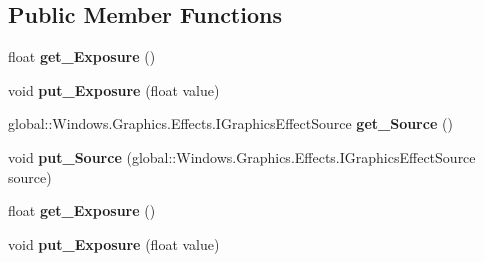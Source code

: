 \subsection*{Public Member Functions}
\begin{DoxyCompactItemize}
\item 
\mbox{\label{interface_microsoft_1_1_graphics_1_1_canvas_1_1_effects_1_1_i_exposure_effect_a1188ad6764c93c08d490ac661c4032b4}} 
float {\bfseries get\+\_\+\+Exposure} ()
\item 
\mbox{\label{interface_microsoft_1_1_graphics_1_1_canvas_1_1_effects_1_1_i_exposure_effect_a2c5a92f7fb62eb7eb49b18388e03bc0c}} 
void {\bfseries put\+\_\+\+Exposure} (float value)
\item 
\mbox{\label{interface_microsoft_1_1_graphics_1_1_canvas_1_1_effects_1_1_i_exposure_effect_a79e10b828da17b64688522fdf34da98b}} 
global\+::\+Windows.\+Graphics.\+Effects.\+I\+Graphics\+Effect\+Source {\bfseries get\+\_\+\+Source} ()
\item 
\mbox{\label{interface_microsoft_1_1_graphics_1_1_canvas_1_1_effects_1_1_i_exposure_effect_acb4229c8aabe612f5f1c7898033e5826}} 
void {\bfseries put\+\_\+\+Source} (global\+::\+Windows.\+Graphics.\+Effects.\+I\+Graphics\+Effect\+Source source)
\item 
\mbox{\label{interface_microsoft_1_1_graphics_1_1_canvas_1_1_effects_1_1_i_exposure_effect_a1188ad6764c93c08d490ac661c4032b4}} 
float {\bfseries get\+\_\+\+Exposure} ()
\item 
\mbox{\label{interface_microsoft_1_1_graphics_1_1_canvas_1_1_effects_1_1_i_exposure_effect_a2c5a92f7fb62eb7eb49b18388e03bc0c}} 
void {\bfseries put\+\_\+\+Exposure} (float value)
\item 
\mbox{\label{interface_microsoft_1_1_graphics_1_1_canvas_1_1_effects_1_1_i_exposure_effect_a79e10b828da17b64688522fdf34da98b}} 

\end{DoxyCompactItemize}

